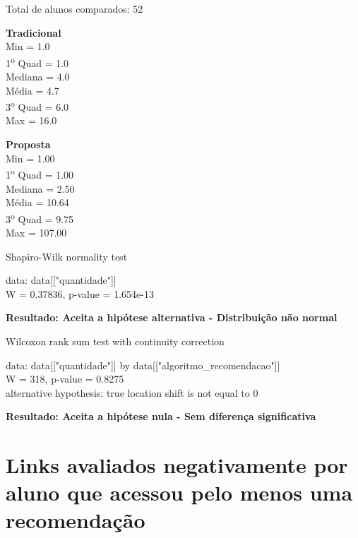 \noindent
Total de alunos comparados: 52

\begin{multicols}{2}

\noindent\textbf{Tradicional}\\
Min =  1.0\\
1\textsuperscript{o} Quad =  1.0\\
Mediana =  4.0\\
Média =  4.7\\
3\textsuperscript{o} Quad = 6.0\\
Max = 16.0\\
\columnbreak

\noindent\textbf{Proposta}\\
Min =   1.00\\
1\textsuperscript{o} Quad =   1.00\\
Mediana =   2.50\\
Média =  10.64\\
3\textsuperscript{o} Quad =  9.75\\
Max = 107.00
\end{multicols}

  Shapiro-Wilk normality test

\noindent
data:  data[["quantidade"]]\\
W = 0.37836, p-value = 1.654e-13

\noindent
\textbf{Resultado: Aceita a hipótese alternativa - Distribuição não normal}

Wilcoxon rank sum test with continuity correction

\noindent
data:  data[["quantidade"]] by data[["algoritmo\_recomendacao"]]\\
W = 318, p-value = 0.8275\\
alternative hypothesis: true location shift is not equal to 0

\noindent
\textbf{Resultado: Aceita a hipótese nula - Sem diferença significativa}

\newpage
\section{Links avaliados negativamente por aluno que acessou pelo menos uma recomendação}


